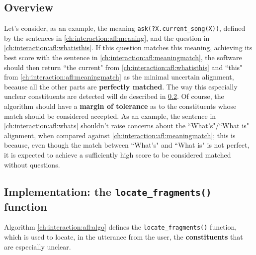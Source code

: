 \subsection{Overview}
Let's consider, as an example, the meaning \texttt{ask(?X.current\_song(X))}, defined by the sentences in \ref{ch:interaction:afl:meaning}, and the question in \ref{ch:interaction:afl:whatisthis}. If this question matches this meaning, achieving its best score with the sentence in  \ref{ch:interaction:afl:meaningmatch}, the software should then return ``the current" from \ref{ch:interaction:afl:whatisthis} and ``this" from \ref{ch:interaction:afl:meaningmatch} as the minimal uncertain alignment, because all the other parts are \textbf{perfectly matched}. The way this especially unclear constituents are detected will de described in \ref{ch:interaction:afl:impl}.
 \label{ch:interaction:afl:meaning}
\vspace{-0.5cm} %
Of course, the algorithm should have a \textbf{margin of tolerance} as to the constituents whose match should be considered accepted. As an example, the sentence in \ref{ch:interaction:afl:whats} shouldn't raise concerns about the ``What's"/``What is" alignment, when compared against \ref{ch:interaction:afl:meaningmatch}; this is because, even though the match between ``What's" and ``What is" is not perfect, it is expected to achieve a sufficiently high score to be considered matched without questions.


\subsection{Implementation: the \texttt{locate\_fragments()} function} \label{ch:interaction:afl:impl}
Algorithm \ref{ch:interaction:afl:algo} defines the \texttt{locate\_fragments()} function, which is used to locate, in the utterance from the user, the \textbf{constituents} that are especially unclear.

